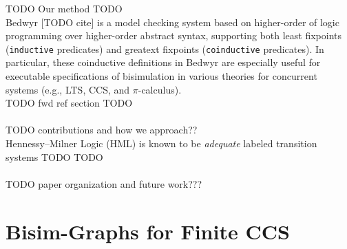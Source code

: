 \documentclass{llncs}
\begin{document}
TODO Our method TODO\\
Bedwyr [TODO cite] is a model checking system based on higher-order of
logic programming over higher-order abstract syntax, supporting both
least fixpoints (\texttt{inductive} predicates) and greatext fixpoints
(\texttt{coinductive} predicates). In particular, these coinductive
definitions in Bedwyr are especially useful for executable specifications
of bisimulation in various theories for concurrent systems (e.g., LTS, CCS,
and $\pi$-calculus).\\
TODO fwd ref section TODO


\paragraph{} TODO contributions and how we approach??\\
Hennessy--Milner Logic (HML) is known to be \emph{adequate}
labeled transition systems TODO TODO

\paragraph{} TODO paper organization and future work???

\section{Bisim-Graphs for Finite CCS} \label{sec:ccsbisim}
\end{document}
